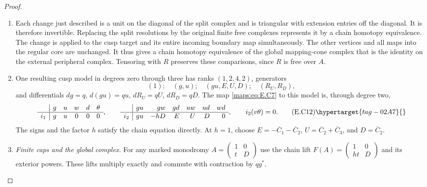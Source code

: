 \begin{proof}
\begin{enumerate}[label={$\langle1\rangle$\arabic*.},leftmargin=*]
\item Each change just described is a unit on the diagonal
of the split complex and is triangular with extension
entries off the diagonal. It is therefore invertible.
Replacing the split resolutions by the original finite
free complexes represents it by a chain homotopy
equivalence.  The change
is applied to the cusp target and its entire incoming
boundary map simultaneously. The other vertices and
all maps into the regular core are unchanged. It thus
gives a chain homotopy equivalence of the global
mapping-cone complex that is the identity on the
external peripheral complex. Tensoring with $R$ preserves these comparisons,
since $R$ is free over $A$.

\item One resulting cusp model in degrees zero through three
has ranks $(1,2,4,2)$, generators
\[
 (1);\quad(g,u);\quad(gu,E,U,D);\quad(R_U,R_D),
\]
and differentials $dg=q$, $d(gu)=qu$,
$dR_U=qU$, $dR_D=qD$. The map \eqref{maps:eq:E.C7} to this model
is, through degree two,
\[
 \begin{array}{c|ccccc}
  &g&u&w&d&\theta\\ \hline
  i_1&g&u&0&0&0
 \end{array},\qquad
 \begin{array}{c|rrrrrr}
  &gu&gw&gd&uw&ud&wd\\ \hline
  i_2&gu&-hD&E&U&D&0
 \end{array},
 \qquad i_2(v\theta)=0.
 \tag{E.C12}\hypertarget{tag-02A7}{}\label{maps:eq:E.C12}
\]
The signs and the factor $h$ satisfy the chain equation
directly. At $h=1$, choose
$E=-\overline C_1-\overline C_2$,
$U=\overline C_2+\overline C_3$, and
$D=\overline C_2$.

\item \emph{Finite caps and the global complex.}
For any marked monodromy
$A=\left(\begin{smallmatrix}1&0\\t&D\end{smallmatrix}\right)$
use the chain lift
$F(A)=\left(\begin{smallmatrix}1&0\\ht&D\end{smallmatrix}\right)$
and its exterior powers. These lifts multiply exactly
and commute with contraction by $qg^*$.


\end{enumerate}
\end{proof}

